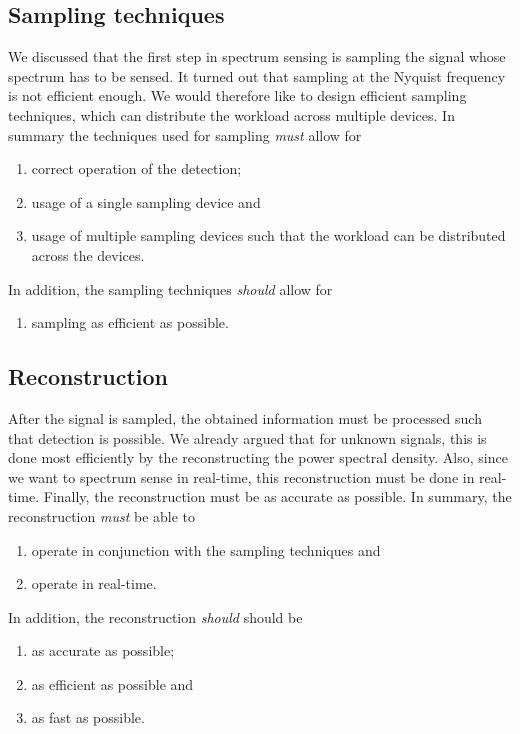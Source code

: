 \documentclass[a4paper, openany, oneside]{memoir}
\begin{document}
\subsection{Sampling techniques}
We discussed that the first step in spectrum sensing is sampling the signal whose spectrum has to be sensed. It turned out that sampling at the Nyquist frequency is not efficient enough. We would therefore like to design efficient sampling techniques, which can distribute the workload across multiple devices. In summary the techniques used for sampling \emph{must} allow for
\begin{enumerate}
    \item correct operation of the detection;
    \item usage of a single sampling device and
    \item usage of multiple sampling devices such that the workload can be distributed across the devices.
\end{enumerate}
In addition, the sampling techniques \emph{should} allow for
\begin{enumerate}
    \item sampling as efficient as possible.
\end{enumerate}

\subsection{Reconstruction}
After the signal is sampled, the obtained information must be processed such that detection is possible. We already argued that for unknown signals, this is done most efficiently by the reconstructing the power spectral density. Also, since we want to spectrum sense in real-time, this reconstruction must be done in real-time. Finally, the reconstruction must be as accurate as possible. In summary, the reconstruction \textit{must} be able to
\begin{enumerate}
    \item operate in conjunction with the sampling techniques and
    \item operate in real-time.
\end{enumerate}
In addition, the reconstruction \textit{should} should be
\begin{enumerate}
    \item as accurate as possible;
    \item as efficient as possible and
    \item as fast as possible.
\end{enumerate}
\end{document}
